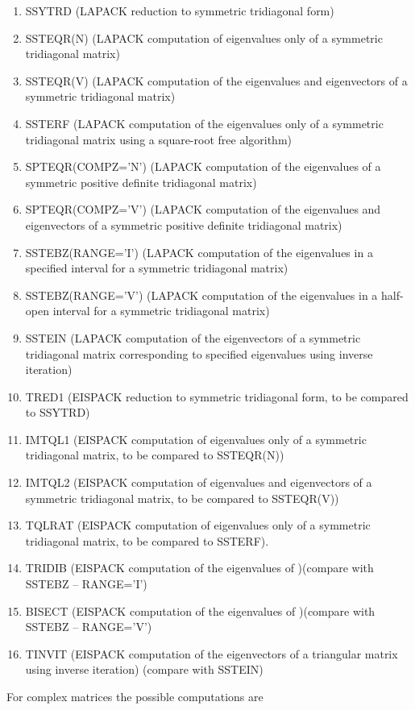 \begin{enumerate}
\item SSYTRD (LAPACK reduction to symmetric tridiagonal form)
\item SSTEQR(N) (LAPACK computation of eigenvalues only of a symmetric
tridiagonal matrix)
\item SSTEQR(V) (LAPACK computation of the eigenvalues and eigenvectors of
a symmetric tridiagonal matrix)
\item SSTERF (LAPACK computation of the eigenvalues only of a symmetric
tridiagonal matrix using a square-root free algorithm)
\item SPTEQR(COMPZ='N') (LAPACK computation of the eigenvalues of a
symmetric positive definite tridiagonal matrix)
\item SPTEQR(COMPZ='V') (LAPACK computation of the eigenvalues and
eigenvectors of a symmetric positive definite tridiagonal matrix)
\item SSTEBZ(RANGE='I') (LAPACK computation of the eigenvalues in a
specified interval for a symmetric tridiagonal matrix)
\item SSTEBZ(RANGE='V') (LAPACK computation of the eigenvalues in a
half-open interval for a symmetric tridiagonal matrix)
\item SSTEIN (LAPACK computation of the eigenvectors of a symmetric
tridiagonal matrix corresponding to specified eigenvalues using inverse
iteration)
\item TRED1 (EISPACK reduction to symmetric tridiagonal form, to be compared 
to SSYTRD)
\item IMTQL1 (EISPACK computation of eigenvalues only of a symmetric
tridiagonal matrix, to be compared to SSTEQR(N))
\item IMTQL2 (EISPACK computation of eigenvalues and eigenvectors of a 
symmetric tridiagonal matrix, to be compared to SSTEQR(V))
\item TQLRAT (EISPACK computation of eigenvalues only of a symmetric
tridiagonal matrix, to be compared to SSTERF).
\item TRIDIB (EISPACK computation of the eigenvalues of )(compare with SSTEBZ -- RANGE='I')
\item BISECT (EISPACK computation of the eigenvalues of )(compare with SSTEBZ -- RANGE='V')
\item TINVIT (EISPACK computation of the eigenvectors of a triangular
matrix using inverse iteration) (compare with SSTEIN)
\end{enumerate}

For complex matrices the possible computations are

